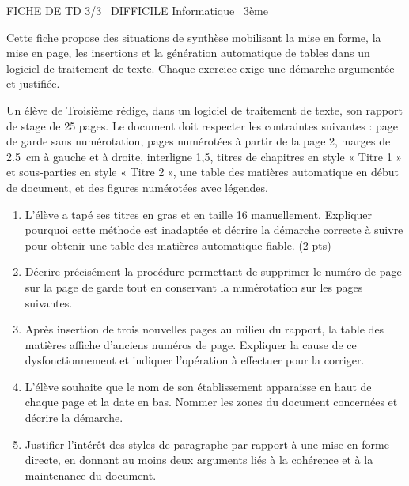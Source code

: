 \documentclass[11pt]{article}
\begin{document}
\begin{tcolorbox}[enhanced,colback=popink,colframe=popink,arc=10pt,boxrule=0pt,left=12pt,right=12pt,top=9pt,bottom=9pt]
{\color{white}\popxbold\small FICHE DE TD 3/3 \textbullet\ DIFFICILE \hfill Informatique \textbullet\ 3ème\par}
\end{tcolorbox}
\vspace{4pt}
Cette fiche propose des situations de synthèse mobilisant la mise en forme, la mise en page, les insertions et la génération automatique de tables dans un logiciel de traitement de texte. Chaque exercice exige une démarche argumentée et justifiée.

\begin{exercice}
Un élève de Troisième rédige, dans un logiciel de traitement de texte, son rapport de stage de 25 pages. Le document doit respecter les contraintes suivantes : page de garde sans numérotation, pages numérotées à partir de la page 2, marges de \SI{2,5}{\centi\metre} à gauche et à droite, interligne 1,5, titres de chapitres en style « Titre 1 » et sous-parties en style « Titre 2 », une table des matières automatique en début de document, et des figures numérotées avec légendes.
\begin{enumerate}
\item L'élève a tapé ses titres en gras et en taille 16 manuellement. Expliquer pourquoi cette méthode est inadaptée et décrire la démarche correcte à suivre pour obtenir une table des matières automatique fiable. (2 pts)
\item Décrire précisément la procédure permettant de supprimer le numéro de page sur la page de garde tout en conservant la numérotation sur les pages suivantes.
\item Après insertion de trois nouvelles pages au milieu du rapport, la table des matières affiche d'anciens numéros de page. Expliquer la cause de ce dysfonctionnement et indiquer l'opération à effectuer pour la corriger.
\item L'élève souhaite que le nom de son établissement apparaisse en haut de chaque page et la date en bas. Nommer les zones du document concernées et décrire la démarche.
\item Justifier l'intérêt des styles de paragraphe par rapport à une mise en forme directe, en donnant au moins deux arguments liés à la cohérence et à la maintenance du document.
\end{enumerate}
\end{exercice}
\end{document}
